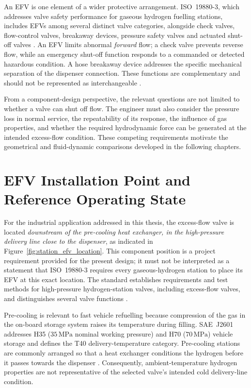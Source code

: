 An EFV is one element of a wider protective arrangement. ISO~19880-3, which addresses valve safety performance for gaseous hydrogen fuelling stations, includes EFVs among several distinct valve categories, alongside check valves, flow-control valves, breakaway devices, pressure safety valves and actuated shut-off valves \cite{iso19880_3}. An EFV limits abnormal \emph{forward} flow; a check valve prevents reverse flow, while an emergency shut-off function responds to a commanded or detected hazardous condition. A hose breakaway device addresses the specific mechanical separation of the dispenser connection. These functions are complementary and should not be represented as interchangeable \cite{iso19880_1,iso19880_3,h2tools_valves}.

From a component-design perspective, the relevant questions are not limited to whether a valve can shut off flow. The engineer must also consider the pressure loss in normal service, the repeatability of its response, the influence of gas properties, and whether the required hydrodynamic force can be generated at the intended excess-flow condition. These competing requirements motivate the geometrical and fluid-dynamic comparisons developed in the following chapters.

\section{EFV Installation Point and Reference Operating State}
\label{sec:efv_reference_state}

For the industrial application addressed in this thesis, the excess-flow valve is located \emph{downstream of the pre-cooling heat exchanger, in the high-pressure delivery line close to the dispenser}, as indicated in Figure~\ref{fig:station_efv_location}. This component position is a project requirement provided for the present design; it must not be interpreted as a statement that ISO~19880-3 requires every gaseous-hydrogen station to place its EFV at this exact location. The standard establishes requirements and test methods for high-pressure hydrogen-station valves, including excess-flow valves, and distinguishes several valve functions \cite{iso19880_3}.

Pre-cooling is relevant to fast vehicle refuelling because compression of the gas in the on-board storage system raises its temperature during filling. SAE~J2601 addresses H35 ($35\,\mathrm{MPa}$ nominal working pressure) and H70 ($70\,\mathrm{MPa}$) vehicle storage and defines the T40 delivery-temperature category. Pre-cooling stations are commonly arranged so that a heat exchanger conditions the hydrogen before it passes towards the dispenser \cite{sae_j2601,elgowainy2017,iso19880_1}. Consequently, ambient-temperature hydrogen properties are not representative of the selected valve's intended cold delivery-line condition.

